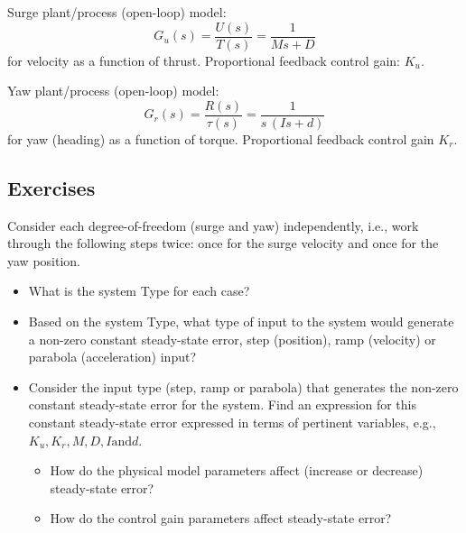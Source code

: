 \documentclass[11pt]{article}
\begin{document}
Surge plant/process (open-loop) model:
\[
G_u(s)=\frac{ U(s) }{ T(s) } = \frac{ 1 }{ Ms+D } 
\]
for velocity as a function of thrust. Proportional feedback control gain: $K_u$.

Yaw plant/process (open-loop) model:
\[
G_r(s) = \frac{ R(s) }{ \tau (s) } = \frac{ 1 }{ s \, (Is+d) } 
\]
for yaw (heading) as a function of torque. Proportional feedback control gain $K_r$.

\subsection*{Exercises}
Consider each degree-of-freedom (surge and yaw) independently, i.e., work through the following steps twice: once for the surge velocity and once for the yaw position.

\begin{itemize}
  \item What is the system Type for each case?
  \item Based on the system Type, what type of input to the system would generate a non-zero constant steady-state error,  step (position), ramp (velocity) or parabola (acceleration) input?
  \item Consider the input type (step, ramp or parabola) that generates the non-zero constant steady-state error for the system.  Find an expression for this constant steady-state error  expressed in terms of pertinent variables, e.g., $K_u, K_r, M, D, I \text{and} d$.
  \begin{itemize}
    \item How do the physical model parameters affect (increase or decrease) steady-state error?
    \item How do the control gain parameters affect steady-state error?
  \end{itemize}
\end{itemize}
\end{document}
